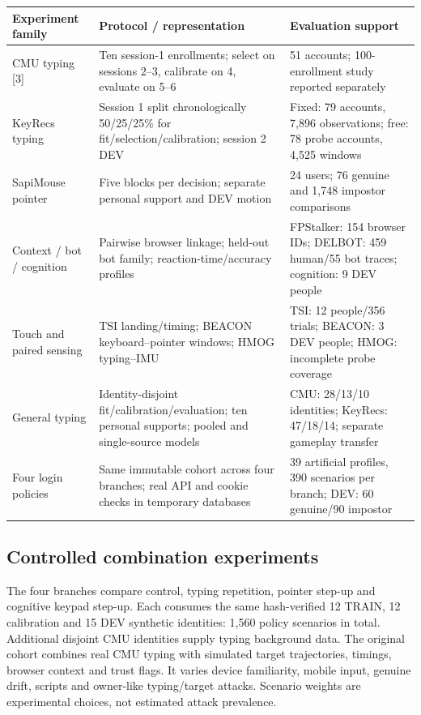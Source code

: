 \documentclass[10pt,a4paper]{article}
\newcommand{\smalltable}{\fontsize{8.5}{10.4}\selectfont}
\begin{document}
\begin{center}\smalltable
\begin{tabularx}{\linewidth}{@{}p{31mm}p{59mm}X@{}}
\toprule
\textbf{Experiment family} & \textbf{Protocol / representation} & \textbf{Evaluation support}\\\midrule
CMU typing [3] & Ten session-1 enrollments; select on sessions 2--3, calibrate on 4, evaluate on 5--6 & 51 accounts; 100-enrollment study reported separately\\
KeyRecs typing & Session 1 split chronologically 50/25/25\% for fit/selection/calibration; session 2 DEV & Fixed: 79 accounts, 7,896 observations; free: 78 probe accounts, 4,525 windows\\
SapiMouse pointer & Five blocks per decision; separate personal support and DEV motion & 24 users; 76 genuine and 1,748 impostor comparisons\\
Context / bot / cognition & Pairwise browser linkage; held-out bot family; reaction-time/accuracy profiles & FPStalker: 154 browser IDs; DELBOT: 459 human/55 bot traces; cognition: 9 DEV people\\
Touch and paired sensing & TSI landing/timing; BEACON keyboard--pointer windows; HMOG typing--IMU & TSI: 12 people/356 trials; BEACON: 3 DEV people; HMOG: incomplete probe coverage\\
General typing & Identity-disjoint fit/calibration/evaluation; ten personal supports; pooled and single-source models & CMU: 28/13/10 identities; KeyRecs: 47/18/14; separate gameplay transfer\\
Four login policies & Same immutable cohort across four branches; real API and cookie checks in temporary databases & 39 artificial profiles, 390 scenarios per branch; DEV: 60 genuine/90 impostor\\\bottomrule
\end{tabularx}
\end{center}

\subsection{Controlled combination experiments}
The four branches compare control, typing repetition, pointer step-up and cognitive keypad step-up. Each consumes the same hash-verified 12 TRAIN, 12 calibration and 15 DEV synthetic identities: 1,560 policy scenarios in total. Additional disjoint CMU identities supply typing background data. The original cohort combines real CMU typing with simulated target trajectories, timings, browser context and trust flags. It varies device familiarity, mobile input, genuine drift, scripts and owner-like typing/target attacks. Scenario weights are experimental choices, not estimated attack prevalence.
\end{document}
